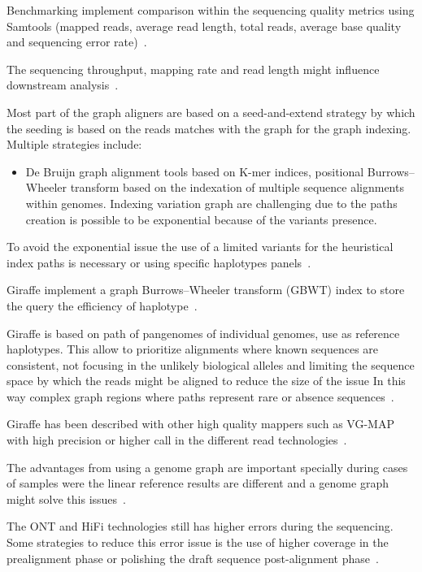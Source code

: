 \documentclass[12pt, letterpaper]{article}
\begin{document}
Benchmarking implement comparison within the sequencing quality metrics using Samtools (mapped reads, average read length, total reads, average base quality and sequencing error rate)~\cite{Wang2026}. 

The sequencing throughput, mapping rate and read length might influence downstream analysis~\cite{Wang2026}.

Most part of the graph aligners are based on a seed-and-extend strategy by which the seeding is based on the reads matches with the graph for the graph indexing. Multiple strategies include:

\begin{itemize}
\item De Bruijn graph alignment tools based on K-mer indices, positional Burrows--Wheeler transform based on the indexation of multiple sequence alignments within genomes. Indexing variation graph are challenging due to the paths creation is possible to be exponential because of the variants presence.
\end{itemize}

To avoid the exponential issue the use of a limited variants for the heuristical index paths is necessary or using specific haplotypes panels~\cite{Rautiainen2023}.

Giraffe implement a graph Burrows--Wheeler transform (GBWT) index to store the query the efficiency of haplotype~\cite{Sirén2021}.

Giraffe is based on path of pangenomes of individual genomes, use as reference haplotypes. This allow to prioritize alignments where known sequences are consistent, not focusing in the unlikely biological alleles and limiting the sequence space by which the reads might be aligned to reduce the size of the issue In this way complex graph regions where paths represent rare or absence sequences~\cite{Sirén2021}.

Giraffe has been described with other high quality mappers such as VG-MAP with high precision or higher call in the different read technologies~\cite{Sirén2021}.

The advantages from using a genome graph are important specially during cases of samples were the linear reference results are different and a genome graph might solve this issues~\cite{Sirén2021}.


The ONT and HiFi technologies still has higher errors during the sequencing. Some strategies to reduce this error issue is the use of higher coverage in the prealignment phase or polishing the draft sequence post-alignment phase~\cite{Zhang2022}.
\end{document}
